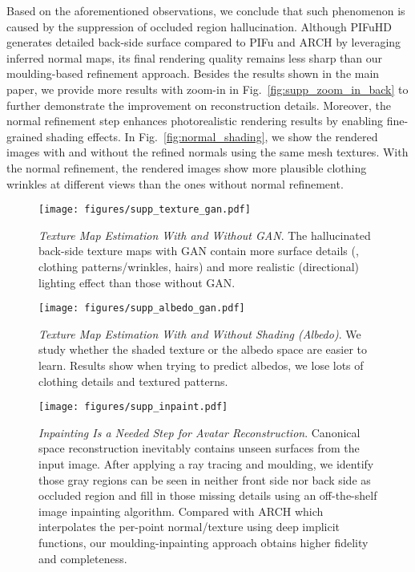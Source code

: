 \documentclass[10pt,twocolumn,letterpaper]{article}
\newcommand{\beforefigcaption}{\vspace{-5mm}}
\newcommand{\afterfigcaption}{\vspace{-5mm}}
\begin{document}
Based on the aforementioned observations, we conclude that such phenomenon is caused by the suppression of occluded region hallucination. Although PIFuHD generates detailed back-side surface compared to PIFu and ARCH by leveraging inferred normal maps, its final rendering quality remains less sharp than our moulding-based refinement approach. Besides the results shown in the main paper, we provide more results with zoom-in in Fig.~\ref{fig:supp_zoom_in_back} to further demonstrate the improvement on reconstruction details.
Moreover, the normal refinement step enhances photorealistic rendering results by enabling fine-grained shading effects. In Fig.~\ref{fig:normal_shading}, we show the rendered images with and without the refined normals using the same mesh textures. With the normal refinement, the rendered images show more plausible clothing wrinkles at different views than the ones without normal refinement.

\begin{figure*}[ptb]
\vspace{-15 pt}
\centering
\texttt{[image: figures/supp\_texture\_gan.pdf]}
\beforefigcaption
\caption{\textit{Texture Map Estimation With and Without GAN}. The hallucinated back-side texture maps with GAN contain more surface details (\eg, clothing patterns/wrinkles, hairs) and more realistic (directional) lighting effect than those without GAN.
}
\vspace{+10pt}
\afterfigcaption
\label{fig:supp_texture_gan}
\end{figure*}

\begin{figure*}[ptb]
\centering
\texttt{[image: figures/supp\_albedo\_gan.pdf]}
\beforefigcaption
\caption{\textit{Texture Map Estimation With and Without Shading (Albedo)}. We study whether the shaded texture or the albedo space are easier to learn. Results show when trying to predict albedos, we lose lots of clothing details and textured patterns.
}
\afterfigcaption
\label{fig:supp_albedo_gan}
\end{figure*}

\begin{figure*}[ptb]
\centering
\texttt{[image: figures/supp\_inpaint.pdf]}
\beforefigcaption
\caption{\textit{Inpainting Is a Needed Step for Avatar Reconstruction}. Canonical space reconstruction inevitably contains unseen surfaces from the input image. After applying a ray tracing and moulding, we identify those gray regions can be seen in neither front side nor back side as occluded region and fill in those missing details using an off-the-shelf image inpainting algorithm. Compared with ARCH which interpolates the per-point normal/texture using deep implicit functions, our moulding-inpainting approach obtains higher fidelity and completeness.
}
\afterfigcaption
\label{fig:inpaint}
\vspace{+15 pt}
\end{figure*}
\end{document}
